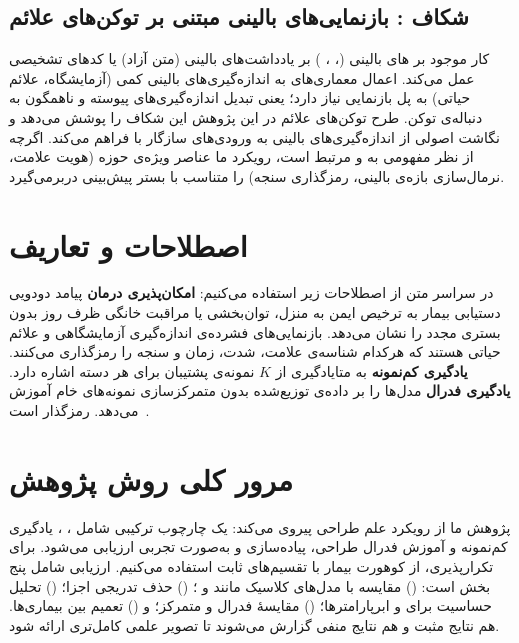 \subsection{شکاف : بازنمایی‌های بالینی مبتنی بر توکن‌های علائم}

کار موجود بر های بالینی (، ، ) بر یادداشت‌های بالینی (متن آزاد) یا کدهای تشخیصی عمل می‌کند. اعمال معماری‌های  به اندازه‌گیری‌های بالینی کمی (آزمایشگاه، علائم حیاتی) به پل بازنمایی نیاز دارد؛ یعنی تبدیل اندازه‌گیری‌های پیوسته و ناهمگون به دنباله‌ی توکن. طرح توکن‌های علائم در این پژوهش این شکاف را پوشش می‌دهد و نگاشت اصولی از اندازه‌گیری‌های بالینی به ورودی‌های سازگار با  فراهم می‌کند. اگرچه از نظر مفهومی به  و  مرتبط است، رویکرد ما عناصر ویژه‌ی حوزه (هویت علامت، نرمال‌سازی بازه‌ی بالینی، رمزگذاری سنجه) را متناسب با بستر پیش‌بینی  دربرمی‌گیرد.

\section{اصطلاحات و تعاریف}

در سراسر متن از اصطلاحات زیر استفاده می‌کنیم: \textbf{امکان‌پذیری درمان} پیامد دودویی دستیابی بیمار به ترخیص ایمن به منزل، توان‌بخشی یا مراقبت خانگی ظرف  روز بدون بستری مجدد را نشان می‌دهد. \textbf{} بازنمایی‌های فشرده‌ی اندازه‌گیری آزمایشگاهی و علائم حیاتی هستند که هرکدام شناسه‌ی علامت، شدت، زمان و سنجه را رمزگذاری می‌کنند. \textbf{یادگیری کم‌نمونه} به متایادگیری از $K$ نمونه‌ی پشتیبان برای هر دسته اشاره دارد. \textbf{یادگیری فدرال} مدل‌ها را بر داده‌ی توزیع‌شده بدون متمرکزسازی نمونه‌های خام آموزش می‌دهد. \textbf{} رمزگذار  است~\cite{sharafi2023ethos}.

\section{مرور کلی روش پژوهش}

پژوهش ما از رویکرد علم طراحی پیروی می‌کند: یک چارچوب ترکیبی شامل ، ، یادگیری کم‌نمونه و آموزش فدرال طراحی، پیاده‌سازی و به‌صورت تجربی ارزیابی می‌شود. برای تکرارپذیری، از کوهورت  بیمار  با تقسیم‌های ثابت استفاده می‌کنیم. ارزیابی شامل پنج بخش است: () مقایسه با مدل‌های کلاسیک مانند  و ؛ () حذف تدریجی اجزا؛ () تحلیل حساسیت برای  و ابرپارامترها؛ () مقایسۀ فدرال و متمرکز؛ و () تعمیم بین بیماری‌ها. هم نتایج مثبت و هم نتایج منفی گزارش می‌شوند تا تصویر علمی کامل‌تری ارائه شود.

